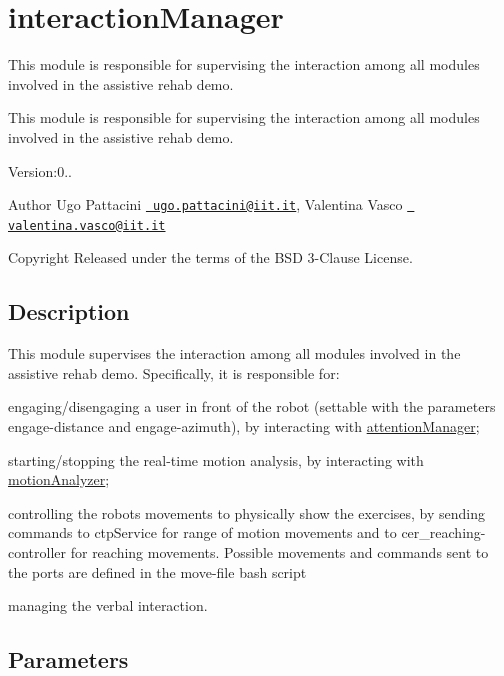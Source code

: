 \section{interaction\+Manager}
\label{group__interactionManager}


This module is responsible for supervising the interaction among all modules involved in the assistive rehab demo.  


This module is responsible for supervising the interaction among all modules involved in the assistive rehab demo. 

Version\+:0.. \begin{DoxyAuthor}{Author}
Ugo Pattacini \href{mailto:ugo.pattacini@iit.it}{\texttt{ ugo.\+pattacini@iit.\+it}}, Valentina Vasco \href{mailto:valentina.vasco@iit.it}{\texttt{ valentina.\+vasco@iit.\+it}} ~\newline
 
\end{DoxyAuthor}
\begin{DoxyCopyright}{Copyright}
Released under the terms of the B\+SD 3-\/Clause License. 
\end{DoxyCopyright}
\hypertarget{group__skeletonViewer_intro_sec}{}\subsection{Description}\label{group__skeletonViewer_intro_sec}
This module supervises the interaction among all modules involved in the assistive rehab demo. Specifically, it is responsible for\+:
\begin{DoxyItemize}
\item engaging/disengaging a user in front of the robot (settable with the parameters engage-\/distance and engage-\/azimuth), by interacting with \mbox{\hyperlink{group__attentionManager}{attention\+Manager}};
\item starting/stopping the real-\/time motion analysis, by interacting with \mbox{\hyperlink{group__motionAnalyzer}{motion\+Analyzer}};
\item controlling the robot\textquotesingle{}s movements to physically show the exercises, by sending commands to ctp\+Service for range of motion movements and to cer\+\_\+reaching-\/controller for reaching movements. Possible movements and commands sent to the ports are defined in the move-\/file bash script
\item managing the verbal interaction.
\end{DoxyItemize}\hypertarget{group__skeletonViewer_parameters_sec}{}\subsection{Parameters}\label{group__skeletonViewer_parameters_sec}

